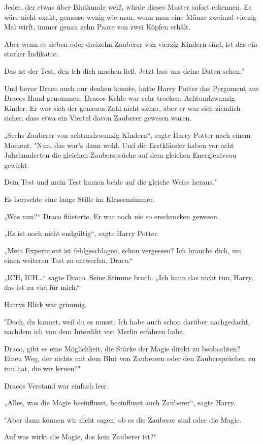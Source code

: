 {Jeder, der etwas über Blutkunde weiß, würde dieses Muster sofort erkennen. Es wäre nicht exakt, genauso wenig wie man, wenn man eine Münze zweimal vierzig Mal wirft, immer genau zehn Paare von zwei Köpfen erhält.

Aber wenn es sieben oder dreizehn Zauberer von vierzig Kindern sind, ist das ein starker Indikator.

Das ist der Test, den ich dich machen ließ. Jetzt lass uns deine Daten sehen."

Und bevor Draco auch nur denken konnte, hatte Harry Potter das Pergament aus Dracos Hand genommen. Dracos Kehle war sehr trocken. Achtundzwanzig Kinder. Er war sich der genauen Zahl nicht sicher, aber er war sich ziemlich sicher, dass etwa ein Viertel davon Zauberer gewesen waren.

„Sechs Zauberer von achtundzwanzig Kindern“, sagte Harry Potter nach einem Moment. "Nun, das war's dann wohl. Und die Erstklässler haben vor acht Jahrhunderten die gleichen Zaubersprüche auf dem gleichen Energieniveau gewirkt.

Dein Test und mein Test kamen beide auf die gleiche Weise heraus."

Es herrschte eine lange Stille im Klassenzimmer.

„Was nun?“ Draco flüsterte. Er war noch nie so erschrocken gewesen.

„Es ist noch nicht endgültig“, sagte Harry Potter.

„Mein Experiment ist fehlgeschlagen, schon vergessen? Ich brauche dich, um einen weiteren Test zu entwerfen, Draco.“

„ICH, ICH…“ sagte Draco. Seine Stimme brach. „Ich kann das nicht tun, Harry, das ist zu viel für mich.“

Harrys Blick war grimmig.

"Doch, du kannst, weil du es musst. Ich habe auch schon darüber nachgedacht, nachdem ich von dem Interdikt von Merlin erfahren habe.

Draco, gibt es eine Möglichkeit, die Stärke der Magie direkt zu beobachten? Einen Weg, der nichts mit dem Blut von Zauberern oder den Zaubersprüchen zu tun hat, die wir lernen?"

Dracos Verstand war einfach leer.

„Alles, was die Magie beeinflusst, beeinflusst auch Zauberer“, sagte Harry.

"Aber dann können wir nicht sagen, ob es die Zauberer sind oder die Magie.

Auf was wirkt die Magie, das kein Zauberer ist?"

}
